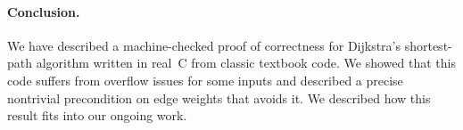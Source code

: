 


\paragraph{Conclusion.}
We have described a machine-checked proof of correctness for Dijkstra’s 
shortest-path algorithm written in real~C from classic textbook code.
We showed that this code suffers from overflow issues for some 
inputs and described a precise nontrivial precondition on edge weights that 
avoids it.  We described how this result fits into our ongoing work.
